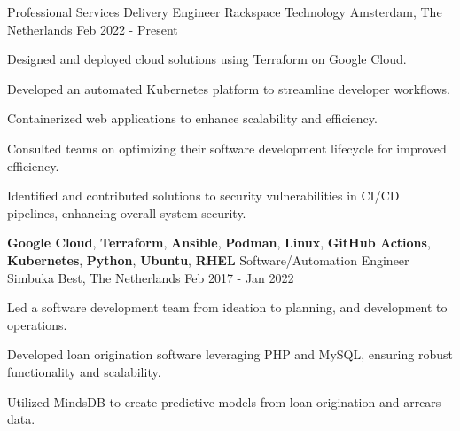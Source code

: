 

\begin{cventries}

  \cventry
    {Professional Services Delivery Engineer} %
    {Rackspace Technology} %
    {Amsterdam, The Netherlands} %
    {Feb 2022 - Present} %
    {
      \begin{cvitems} %
        \item {Designed and deployed cloud solutions using Terraform on Google Cloud.}
        \item {Developed an automated Kubernetes platform to streamline developer workflows.}
        \item {Containerized web applications to enhance scalability and efficiency.}
        \item {Consulted teams on optimizing their software development lifecycle for improved efficiency.}
        \item {Identified and contributed solutions to security vulnerabilities in CI/CD pipelines, enhancing overall system security.}
      \end{cvitems}
    }
    {\textbf{Google Cloud}, \textbf{Terraform}, \textbf{Ansible}, \textbf{Podman}, \textbf{Linux}, \textbf{GitHub Actions}, \textbf{Kubernetes}, \textbf{Python}, \textbf{Ubuntu}, \textbf{RHEL}}
  \cventry
    {Software/Automation Engineer} %
    {Simbuka} %
    {Best, The Netherlands} %
    {Feb 2017 - Jan 2022} %
    {
      \begin{cvitems} %
        \item {Led a software development team from ideation to planning, and development to operations.}
        \item {Developed loan origination software leveraging PHP and MySQL, ensuring robust functionality and scalability.}
        \item {Utilized MindsDB to create predictive models from loan origination and arrears data.}

\end{cvitems}}
\end{cventries}
